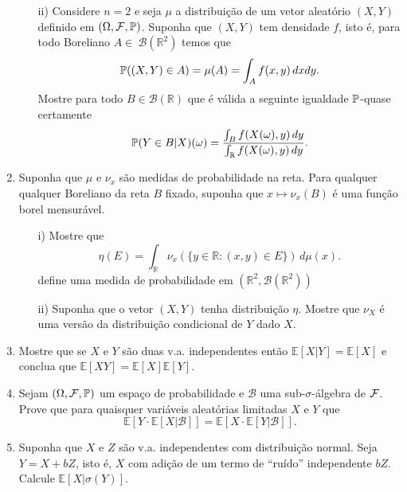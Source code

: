 \begin{enumerate}[leftmargin=*]
\begin{itemize}
		\item[ii)]
		Considere $n=2$ e seja $\mu$ a distribuição de 
		um vetor aleatório $(X,Y)$ definido em $(\Omega,\F,\P)$.
		Suponha que $(X,Y)$ tem densidade $f$, isto é, 
		para todo Boreliano $A\in\ \mathscr{B}(\mathbb{R}^2)$
		temos que
		\[
		\P((X,Y)\in A) = \mu(A) = \int_{A}f(x,y) \, dxdy. 	
		\]
		Mostre para todo $B\in\mathscr{B}(\mathbb{R})$
		que é válida a seguinte igualdade $\P$-quase certamente
		\[
			\P(Y\in B|X)(\omega) 
			= 
			\frac{\int_{B}f(X(\omega),y)\, dy }
			{\int_{\mathbb{R}} f(X(\omega),y)\, dy }.
		\]
	\end{itemize}



\item 
Suponha que $\mu$ e $\nu_x$ são medidas de probabilidade 
na reta. Para qualquer qualquer Boreliano 
da reta $B$ fixado, suponha que  $x\mapsto \nu_x(B)$ é uma função 
borel mensurável. 
%
%
	\begin{itemize}
		\item[i)]
		Mostre que 
		\[
			\eta(E) =\int_{\mathbb{R}} \nu_x(\{y\in\mathbb{R}: (x,y)\in E\} )
					\, d\mu(x).
		\] 
		define uma medida de probabilidade em 
		$(\mathbb{R}^2,\mathscr{B}(\mathbb{R}^2))$
		
		\item[ii)]
		Suponha que o vetor $(X,Y)$ tenha distribuição $\eta$.
		Mostre que $\nu_{X}$ é uma versão da distribuição 
		condicional de $Y$ dado $X$. 
	\end{itemize}



\item Mostre que se $X$ e $Y$ são duas v.a. independentes
então $\mathbb{E}[X|Y]=\mathbb{E}[X]$ e conclua que 
$\mathbb{E}[XY]=\mathbb{E}[X]\mathbb{E}[Y]$.









\item Sejam $(\Omega,\F,\P)$ um espaço de probabilidade e 
$\mathscr{B}$ uma sub-$\sigma$-álgebra de $\F$.
Prove que para quaisquer variáveis aleatórias 
limitadas $X$ e $Y$ que 
	\[
	\mathbb{E}[Y\cdot \mathbb{E}[X|\mathscr{B}]]
	=
	\mathbb{E}[X\cdot \mathbb{E}[Y|\mathscr{B}]].
	\]







\item 
Suponha que $X$ e $Z$ são v.a. independentes com
distribuição normal. Seja $Y=X+bZ$, isto é, 
$X$ com adição de um termo de ``ruído'' independente $bZ$.
Calcule $\mathbb{E}[X|\sigma(Y)]$. 



\end{enumerate}
